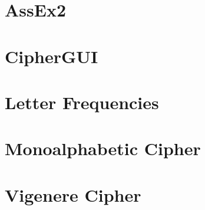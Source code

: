 \documentclass{article}
\begin{document}
\section{AssEx2}

\section{CipherGUI}

\section{Letter Frequencies}

\section{Monoalphabetic Cipher}

\section{Vigenere Cipher}

\end{document}
